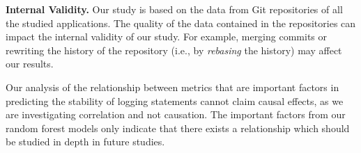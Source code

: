 \noindent \textbf{Internal Validity.} Our study is based on the data from Git repositories of all the studied applications. The quality of the data contained in the repositories can impact the internal validity of our study. For example, merging commits or rewriting the history of the repository (i.e., by \emph{rebasing} the history) may affect our results.  

Our analysis of the relationship between metrics that are important factors in predicting the stability of logging statements cannot claim causal effects, as we are investigating correlation and not causation. The important factors from our random forest models only indicate that there exists a relationship which should be studied in depth in future studies. 



